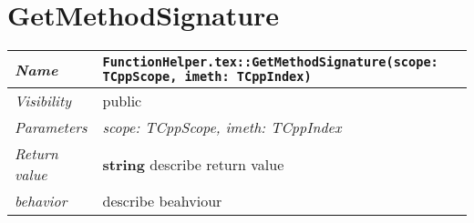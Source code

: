  \section{GetMethodSignature}
\begin{longtable}{p{3cm} @{\hskip 1cm} p{12cm}}
 \hline
\textit{Name} & \texttt{FunctionHelper.tex::GetMethodSignature(scope: TCppScope, imeth: TCppIndex)}\\
\hline
 \textit{Visibility} & public\\
\hline
\textit{Parameters} & \textit{scope: TCppScope, imeth: TCppIndex}\\
\hline
\textit{Return value} & \textbf{ string} describe return value\\
  \hline
 \textit{behavior} & describe beahviour \\
\hline
\end{longtable} \pagebreak
 